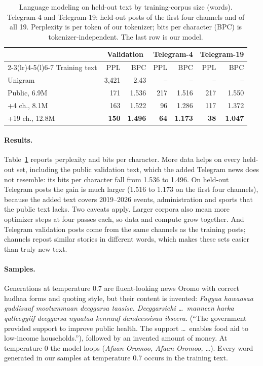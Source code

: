 \documentclass[11pt]{article}
\newcommand{\om}[1]{\textit{#1}}
\begin{document}
\begin{table}[t]
\centering
\small
\setlength{\tabcolsep}{3pt}
\begin{tabular}{@{}lrrrrrr@{}}
\toprule
& \multicolumn{2}{c}{Validation} & \multicolumn{2}{c}{Telegram-4} & \multicolumn{2}{c}{Telegram-19} \\
\cmidrule(lr){2-3}\cmidrule(lr){4-5}\cmidrule(l){6-7}
Training text & PPL & BPC & PPL & BPC & PPL & BPC \\
\midrule
Unigram & 3,421 & 2.43 & -- & -- & -- & -- \\
Public, 6.9M & 171 & 1.536 & 217 & 1.516 & 217 & 1.550 \\
+4 ch., 8.1M & 163 & 1.522 & 96 & 1.286 & 117 & 1.372 \\
+19 ch., 12.8M & \textbf{150} & \textbf{1.496} & \textbf{64} & \textbf{1.173} & \textbf{38} & \textbf{1.047} \\
\bottomrule
\end{tabular}
\caption{Language modeling on held-out text by training-corpus size (words). Telegram-4 and Telegram-19: held-out posts of the first four channels and of all 19. Perplexity is per token of our tokenizer; bits per character (BPC) is tokenizer-independent. The last row is our model.}
\label{tab:lm}
\end{table}

\paragraph{Results.} Table~\ref{tab:lm} reports perplexity and bits per character. More data helps on every held-out set, including the public validation text, which the added Telegram news does not resemble: its bits per character fall from 1.536 to 1.496. On held-out Telegram posts the gain is much larger (1.516 to 1.173 on the first four channels), because the added text covers 2019--2026 events, administration and sports that the public text lacks. Two caveats apply. Larger corpora also mean more optimizer steps at four passes each, so data and compute grow together. And Telegram validation posts come from the same channels as the training posts; channels repost similar stories in different words, which makes these sets easier than truly new text.

\paragraph{Samples.} Generations at temperature 0.7 are fluent-looking news Oromo with correct hudhaa forms and quoting style, but their content is invented: \om{Fayyaa hawaasaa guddisuuf mootummaan deeggarsa taasise. Deeggarsichi \dots\ manneen harka qalleeyyiif deeggarsa nyaataa kennuuf dandeessisuu ibseera.} (``The government provided support to improve public health. The support \dots\ enables food aid to low-income households.''), followed by an invented amount of money. At temperature 0 the model loops (\om{Afaan Oromoo, Afaan Oromoo, \dots}). Every word generated in our samples at temperature 0.7 occurs in the training text.
\end{document}
